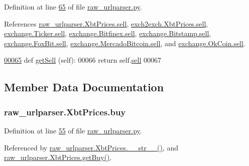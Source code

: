 Definition at line \hyperlink{raw__urlparser_8py_source_l00065}{65} of file \hyperlink{raw__urlparser_8py_source}{raw\+\_\+urlparser.\+py}.



References \hyperlink{raw__urlparser_8py_source_l00054}{raw\+\_\+urlparser.\+Xbt\+Prices.\+sell}, \hyperlink{exch2exch_8py_source_l00058}{exch2exch.\+Xbt\+Prices.\+sell}, \hyperlink{exchange_8py_source_l00059}{exchange.\+Ticker.\+sell}, \hyperlink{exchange_8py_source_l00332}{exchange.\+Bitfinex.\+sell}, \hyperlink{exchange_8py_source_l00401}{exchange.\+Bitstamp.\+sell}, \hyperlink{exchange_8py_source_l00473}{exchange.\+Fox\+Bit.\+sell}, \hyperlink{exchange_8py_source_l00535}{exchange.\+Mercado\+Bitcoin.\+sell}, and \hyperlink{exchange_8py_source_l00600}{exchange.\+Ok\+Coin.\+sell}.


\begin{DoxyCode}
\hypertarget{classraw__urlparser_1_1_xbt_prices.tex_l00065}{}\hyperlink{classraw__urlparser_1_1_xbt_prices_a1a1d7e7b76f611ae334b0950b334dda1}{00065}     \textcolor{keyword}{def }\hyperlink{classraw__urlparser_1_1_xbt_prices_a1a1d7e7b76f611ae334b0950b334dda1}{getSell} (self):
00066         \textcolor{keywordflow}{return} self.\hyperlink{classraw__urlparser_1_1_xbt_prices_a22b483cac27a5b17f9e7b265c219bb99}{sell}
00067         
\end{DoxyCode}


\subsection{Member Data Documentation}
\subsubsection[{\texorpdfstring{buy}{buy}}]{\setlength{\rightskip}{0pt plus 5cm}raw\+\_\+urlparser.\+Xbt\+Prices.\+buy}\hypertarget{classraw__urlparser_1_1_xbt_prices_a87eba659d6598ffd66c694535e1b7a7a}{}\label{classraw__urlparser_1_1_xbt_prices_a87eba659d6598ffd66c694535e1b7a7a}


Definition at line \hyperlink{raw__urlparser_8py_source_l00055}{55} of file \hyperlink{raw__urlparser_8py_source}{raw\+\_\+urlparser.\+py}.



Referenced by \hyperlink{raw__urlparser_8py_source_l00074}{raw\+\_\+urlparser.\+Xbt\+Prices.\+\_\+\+\_\+str\+\_\+\+\_\+()}, and \hyperlink{raw__urlparser_8py_source_l00062}{raw\+\_\+urlparser.\+Xbt\+Prices.\+get\+Buy()}.

